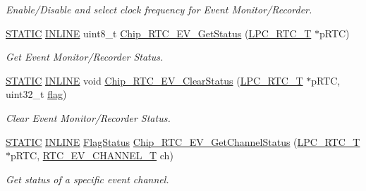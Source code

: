 \begin{DoxyCompactItemize}
\begin{DoxyCompactList}\small\item\em Enable/\+Disable and select clock frequency for Event Monitor/\+Recorder. \end{DoxyCompactList}\item 
\hyperlink{group___l_p_c___types___public___macros_ga10b2d890d871e1489bb02b7e70d9bdfb}{S\+T\+A\+T\+IC} \hyperlink{spifi__18xx__43xx_8h_a2eb6f9e0395b47b8d5e3eeae4fe0c116}{I\+N\+L\+I\+NE} uint8\+\_\+t \hyperlink{group___r_t_c__18_x_x__43_x_x_gaee85196612badea27e318e8b0b8eaf0b}{Chip\+\_\+\+R\+T\+C\+\_\+\+E\+V\+\_\+\+Get\+Status} (\hyperlink{struct_l_p_c___r_t_c___t}{L\+P\+C\+\_\+\+R\+T\+C\+\_\+T} $\ast$p\+R\+TC)
\begin{DoxyCompactList}\small\item\em Get Event Monitor/\+Recorder Status. \end{DoxyCompactList}\item 
\hyperlink{group___l_p_c___types___public___macros_ga10b2d890d871e1489bb02b7e70d9bdfb}{S\+T\+A\+T\+IC} \hyperlink{spifi__18xx__43xx_8h_a2eb6f9e0395b47b8d5e3eeae4fe0c116}{I\+N\+L\+I\+NE} void \hyperlink{group___r_t_c__18_x_x__43_x_x_gaa8609e2618eb4c011a8d8741cebc94c0}{Chip\+\_\+\+R\+T\+C\+\_\+\+E\+V\+\_\+\+Clear\+Status} (\hyperlink{struct_l_p_c___r_t_c___t}{L\+P\+C\+\_\+\+R\+T\+C\+\_\+T} $\ast$p\+R\+TC, uint32\+\_\+t \hyperlink{sdio__18xx__43xx_8c_a8fac2498fe5bd106b35d43af5bc91f6f}{flag})
\begin{DoxyCompactList}\small\item\em Clear Event Monitor/\+Recorder Status. \end{DoxyCompactList}\item 
\hyperlink{group___l_p_c___types___public___macros_ga10b2d890d871e1489bb02b7e70d9bdfb}{S\+T\+A\+T\+IC} \hyperlink{spifi__18xx__43xx_8h_a2eb6f9e0395b47b8d5e3eeae4fe0c116}{I\+N\+L\+I\+NE} \hyperlink{group___l_p_c___types___public___types_ga89136caac2e14c55151f527ac02daaff}{Flag\+Status} \hyperlink{group___r_t_c__18_x_x__43_x_x_gada3039d4961d4e849cba1785a61c9915}{Chip\+\_\+\+R\+T\+C\+\_\+\+E\+V\+\_\+\+Get\+Channel\+Status} (\hyperlink{struct_l_p_c___r_t_c___t}{L\+P\+C\+\_\+\+R\+T\+C\+\_\+T} $\ast$p\+R\+TC, \hyperlink{group___r_t_c__18_x_x__43_x_x_gaac7e8d7c66860037449fdde1bdfb657b}{R\+T\+C\+\_\+\+E\+V\+\_\+\+C\+H\+A\+N\+N\+E\+L\+\_\+T} ch)
\begin{DoxyCompactList}\small\item\em Get status of a specific event channel. \end{DoxyCompactList}\item 

\end{DoxyCompactItemize}
